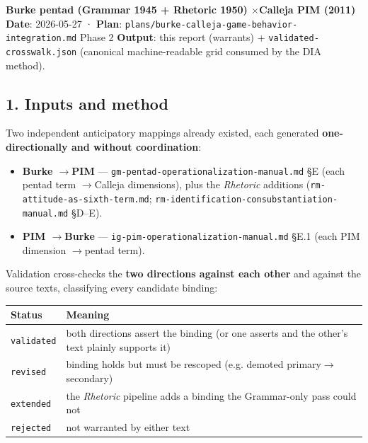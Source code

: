 \documentclass[11pt]{report}
\begin{document}
\textbf{Burke pentad (Grammar 1945 + Rhetoric 1950) $\times$\allowbreak  Calleja PIM (2011)} \textbf{Date}: 2026-05-27 · \textbf{Plan}: \texttt{plans/\discretionary{}{}{}burke-\discretionary{}{}{}calleja-\discretionary{}{}{}game-\discretionary{}{}{}behavior-\discretionary{}{}{}integration.\discretionary{}{}{}md} Phase 2 \textbf{Output}: this report (warrants) + \texttt{validated-\discretionary{}{}{}crosswalk.\discretionary{}{}{}json} (canonical machine-readable grid consumed by the DIA method).


\subsection{1. Inputs and method}


Two independent anticipatory mappings already existed, each generated \textbf{one-directionally and without coordination}:

\begin{itemize}
\item \textbf{Burke $\rightarrow$\allowbreak  PIM} — \texttt{gm-\discretionary{}{}{}pentad-\discretionary{}{}{}operationalization-\discretionary{}{}{}manual.\discretionary{}{}{}md} §E (each pentad term $\rightarrow$\allowbreak  Calleja dimensions), plus the \textit{Rhetoric} additions (\texttt{rm-\discretionary{}{}{}attitude-\discretionary{}{}{}as-\discretionary{}{}{}sixth-\discretionary{}{}{}term.\discretionary{}{}{}md}; \texttt{rm-\discretionary{}{}{}identification-\discretionary{}{}{}consubstantiation-\discretionary{}{}{}manual.\discretionary{}{}{}md} §D–E).
\item \textbf{PIM $\rightarrow$\allowbreak  Burke} — \texttt{ig-\discretionary{}{}{}pim-\discretionary{}{}{}operationalization-\discretionary{}{}{}manual.\discretionary{}{}{}md} §E.1 (each PIM dimension $\rightarrow$\allowbreak  pentad term).
\end{itemize}


Validation cross-checks the \textbf{two directions against each other} and against the source texts, classifying every candidate binding:


\begin{table}[H]
\renewcommand{\arraystretch}{1.25}
\begin{tabularx}{\textwidth}{>{\RaggedRight\arraybackslash}X>{\RaggedRight\arraybackslash}X}
\toprule
Status & Meaning \\
\midrule
\texttt{validated} & both directions assert the binding (or one asserts and the other's text plainly supports it) \\
\texttt{revised} & binding holds but must be rescoped (e.g. demoted primary$\rightarrow$\allowbreak secondary) \\
\texttt{extended} & the \textit{Rhetoric} pipeline adds a binding the Grammar-only pass could not \\
\texttt{rejected} & not warranted by either text \\
\bottomrule
\end{tabularx}
\end{table}
\end{document}

